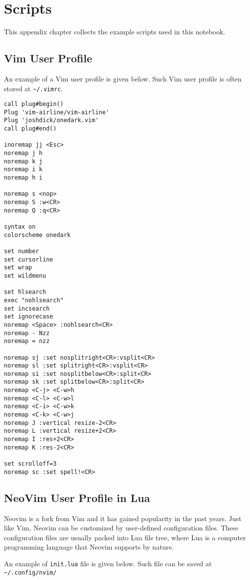 \chapter{Scripts}

This appendix chapter collects the example scripts used in this notebook.

\section{Vim User Profile}

An example of a Vim user profile is given below. Such Vim user profile is often stored at \verb|~/.vimrc|.

\begin{lstlisting}
call plug#begin()
Plug 'vim-airline/vim-airline'
Plug 'joshdick/onedark.vim'
call plug#end()

inoremap jj <Esc>
noremap j h
noremap k j
noremap i k
noremap h i

noremap s <nop>
noremap S :w<CR>
noremap Q :q<CR>

syntax on
colorscheme onedark

set number
set cursorline
set wrap
set wildmenu

set hlsearch
exec "nohlsearch"
set incsearch
set ignorecase
noremap <Space> :nohlsearch<CR>
noremap - Nzz
noremap = nzz

noremap sj :set nosplitright<CR>:vsplit<CR>
noremap sl :set splitright<CR>:vsplit<CR>
noremap si :set nosplitbelow<CR>:split<CR>
noremap sk :set splitbelow<CR>:split<CR>
noremap <C-j> <C-w>h
noremap <C-l> <C-w>l
noremap <C-i> <C-w>k
noremap <C-k> <C-w>j
noremap J :vertical resize-2<CR>
noremap L :vertical resize+2<CR>
noremap I :res+2<CR>
noremap K :res-2<CR>

set scrolloff=3
noremap sc :set spell!<CR>
\end{lstlisting}

\section{NeoVim User Profile in Lua}

Neovim is a fork from Vim and it has gained popularity in the past years. Just like Vim, Neovim can be customized by user-defined configuration files. These configuration files are usually packed into Lua file tree, where Lua is a computer programming language that Neovim supports by nature.

An example of \verb|init.lua| file is given below. Such file can be saved at \verb|~/.config/nvim/|

